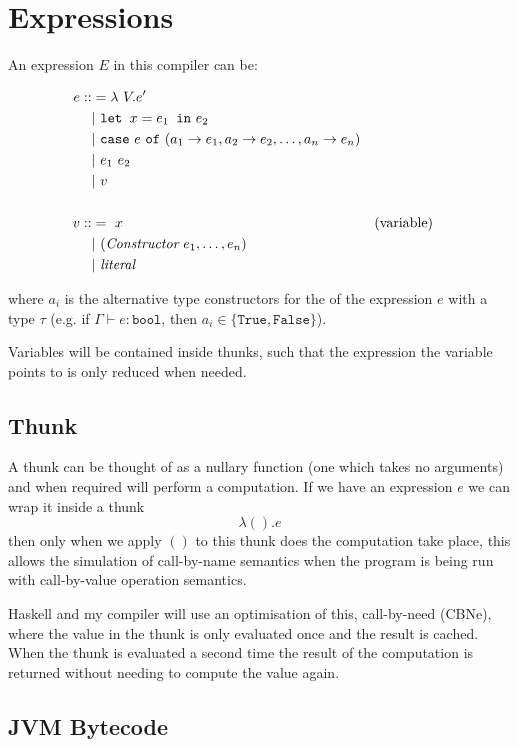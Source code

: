 \documentclass[12pt,a4paper,twoside]{article}
\begin{document}
\section{Expressions}

An expression $E$ in this compiler can be:

\begin{align*}
e ::&= \lambda\ V . e' \\
   &|\ \texttt{let } x = e_1 \texttt{ in} \ e_2\\ 
   &|\ \texttt{case}\ e \ \texttt{of} \ (a_1 \rightarrow e_1, a_2 \rightarrow e_2, \mathellipsis, a_n \rightarrow e_n)\\
   &|\ e_1\ e_2\\
   &|\ v\\\\
v ::&=\ x &&\text{(variable)}\\
   &|\ (\textit{Constructor}\ e_1, \mathellipsis, e_n )\\
   &|\ \textit{literal}
\end{align*}

where $a_i$ is the alternative type constructors for the of the expression $e$ with a type $\tau$
(e.g. if $\Gamma \vdash e : \texttt{bool}$, then $a_i \in \{ \texttt{True},  \texttt{False} \}$).


Variables will be contained inside thunks, such that the expression the variable points to is only reduced 
when needed.

\subsection{Thunk}

A thunk can be thought of as a nullary function (one which takes no arguments) and when required will 
perform a computation. If we have an expression $e$ we can wrap it inside a thunk \[ \lambda (). e \] then 
only when we apply $()$ to this thunk does the computation take place, this allows the
simulation of call-by-name semantics
when the program is being run with call-by-value operation semantics. 

Haskell and my compiler will use an optimisation of this, call-by-need (CBNe), where the value in the thunk is only evaluated once and the 
result is cached. When the thunk is evaluated a second time the result of the computation is returned without needing to compute the value again.


\subsection{JVM Bytecode}
\end{document}

